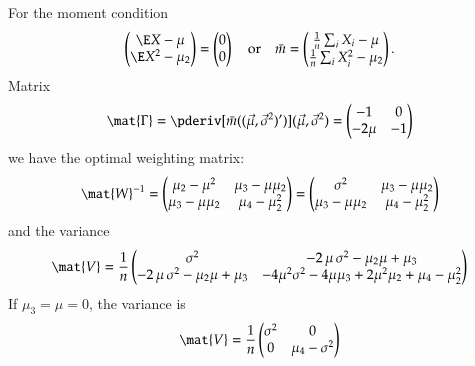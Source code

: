 \documentclass[a4paper]{article}
\numberwithin{equation}{subsection}
\begin{document}
For the moment condition
\begin{equation}
  \begin{pmatrix}
      \E X - \mu\\
      \E X^{2} - \mu_{2}\\
  \end{pmatrix}
  =
  \begin{pmatrix}
    0 \\ 0
  \end{pmatrix}
  \quad\text{or}\quad
  \bar m =
  \begin{pmatrix}
      \frac{1}{n} \sum_{i}X_{i} - \mu\\
      \frac{1}{n} \sum_{i}X_{i}^{2} - \mu_{2}\\
  \end{pmatrix}.
\end{equation}
Matrix
\begin{equation}
  \mat{\Gamma} = \pderiv[\bar m((\vec{\mu},
  \vec{\sigma}^{2})')]{(\vec{\mu}, \vec{\sigma}^{2})} =
  \begin{pmatrix}
    -1 & 0 \\ -2\mu & -1
  \end{pmatrix}
\end{equation}
we have 
the optimal weighting matrix:
\begin{equation}
  \mat{W}^{-1} =
  \begin{pmatrix}
    \mu_{2} - \mu^{2} & \mu_{3} - \mu \mu_{2} \\
    \mu_{3} - \mu \mu_{2} & \mu_{4} - \mu_{2}^{2}
  \end{pmatrix}
  =
  \begin{pmatrix}
    \sigma^{2} & \mu_{3} - \mu \mu_{2} \\
    \mu_{3} - \mu \mu_{2} & \mu_{4} - \mu_{2}^{2}
  \end{pmatrix}
\end{equation}
and the variance
\begin{equation}
  \mat{V} = \frac{1}{n}
  \begin{pmatrix}
    \sigma^{2} & 
    -2\,\mu\, \sigma^{2} - \mu_2 \mu + \mu_3 \\ 
    -2\,\mu\, \sigma^{2} - \mu_2 \mu + \mu_3 &
    -4\mu^{2} \sigma^{2} - 4\mu \mu_{3} +2 \mu^{2}\mu_{2} + \mu_4 - \mu_2^2
  \end{pmatrix}
\end{equation}
If $\mu_{3} = \mu = 0$, the
variance is
\begin{equation}
  \mat{V} = \frac{1}{n}
  \begin{pmatrix}
    \sigma^{2} &  0 \\
    0 & \mu_{4} - \sigma^{2}
  \end{pmatrix}
\end{equation}
\end{document}
